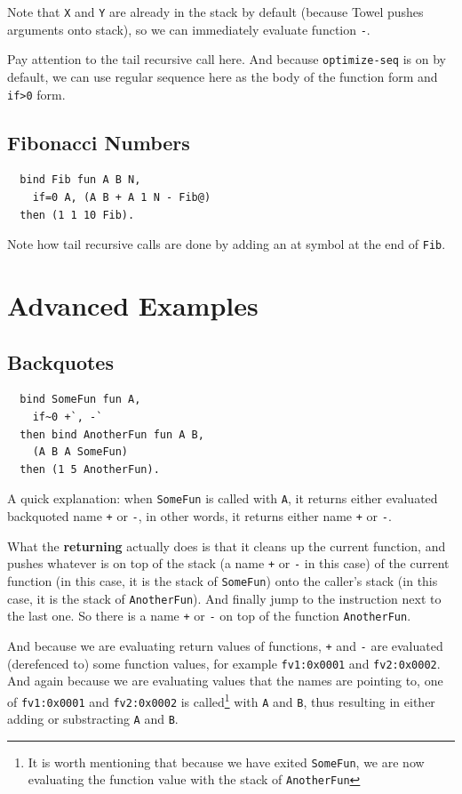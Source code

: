 \documentclass{book}
\begin{document}
Note that \texttt{X} and \texttt{Y} are already in the stack by default (because Towel pushes arguments onto stack), so we can immediately evaluate function \texttt{-}.

Pay attention to the tail recursive call here. And because \texttt{optimize-seq} is on by default, we can use regular sequence here as the body of the function form and \texttt{if>0} form.

\subsection{Fibonacci Numbers}
\begin{verbatim}
  bind Fib fun A B N,
    if=0 A, (A B + A 1 N - Fib@)
  then (1 1 10 Fib).
\end{verbatim}

Note how tail recursive calls are done by adding an at symbol at the end of \texttt{Fib}.

\section{Advanced Examples}

\subsection{Backquotes}
\label{ssec:backquote}
\begin{verbatim}
  bind SomeFun fun A,
    if~0 +`, -`
  then bind AnotherFun fun A B,
    (A B A SomeFun)
  then (1 5 AnotherFun).
\end{verbatim}

A quick explanation: when \texttt{SomeFun} is called with \texttt{A}, it returns either evaluated backquoted name \texttt{+} or \texttt{-}, in other words, it returns either name \texttt{+} or \texttt{-}.

What the \textbf{returning} actually does is that it cleans up the current function, and pushes whatever is on top of the stack (a name \texttt{+} or \texttt{-} in this case) of the current function (in this case, it is the stack of \texttt{SomeFun}) onto the caller's stack (in this case, it is the stack of \texttt{AnotherFun}). And finally jump to the instruction next to the last one. So there is a name \texttt{+} or \texttt{-} on top of the function \texttt{AnotherFun}.

And because we are evaluating return values of functions, \texttt{+} and \texttt{-} are evaluated (derefenced to) some function values, for example \texttt{fv1:0x0001} and \texttt{fv2:0x0002}. And again because we are evaluating values that the names are pointing to, one of \texttt{fv1:0x0001} and \texttt{fv2:0x0002} is called\footnote{It is worth mentioning that because we have exited \texttt{SomeFun}, we are now evaluating the function value with the stack of \texttt{AnotherFun}} with \texttt{A} and \texttt{B}, thus resulting in either adding or substracting \texttt{A} and \texttt{B}.
\end{document}
